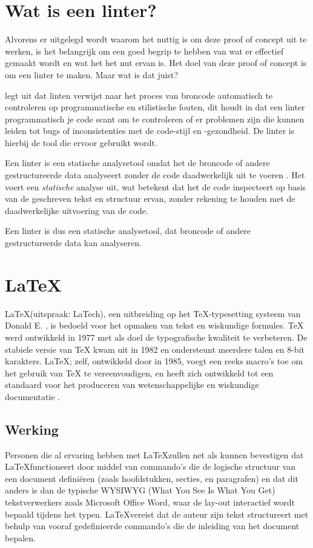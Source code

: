 \section{Wat is een linter?}
Alvorens er uitgelegd wordt waarom het nuttig is om deze proof of concept uit te werken, is het belangrijk om een goed begrip te hebben van wat er effectief gemaakt wordt en wat het het nut ervan is. Het doel van deze proof of concept is om een linter te maken. Maar wat is dat juist?

\textcite{Kamunya2023} legt uit dat linten verwijst naar het proces van broncode automatisch te controleren op programmatische en stilistische fouten, dit houdt in dat een linter programmatisch je code scant om te controleren of er problemen zijn die kunnen leiden tot bugs of inconsistenties met de code-stijl en -gezondheid. De linter is hierbij de tool die ervoor gebruikt wordt.

Een linter is een statische analysetool omdat het de broncode of andere gestructureerde data analyseert zonder de code daadwerkelijk uit te voeren \autocite{Moeller2023}. Het voert een \emph{statische} analyse uit, wat betekent dat het de code inspecteert op basis van de geschreven tekst en structuur ervan, zonder rekening te houden met de daadwerkelijke uitvoering van de code.

Een linter is dus een statische analysetool, dat broncode of andere gestructureerde data kan analyseren.

\section{\LaTeX}
\LaTeX (uitspraak: LaTech), een uitbreiding op het \TeX-typesetting systeem van Donald E. \textcite{Knuth1984}, is bedoeld voor het opmaken van tekst en wiskundige formules. TeX werd ontwikkeld in 1977 met als doel de typografische kwaliteit te verbeteren. De stabiele versie van TeX kwam uit in 1982 en ondersteunt meerdere talen en 8-bit karakters. \LaTeX; zelf, ontwikkeld door \textcite{Lamport1994} in 1985, voegt een reeks macro's toe om het gebruik van TeX te vereenvoudigen, en heeft zich ontwikkeld tot een standaard voor het produceren van wetenschappelijke en wiskundige documentatie \autocite{Oetiker2023}. 

\subsection{Werking}
Personen die al ervaring hebben met \LaTeX zullen net als \textcite{Oetiker2023} kunnen bevestigen dat \LaTeX functioneert door middel van commando's die de logische structuur van een document definiëren (zoals hoofdstukken, secties, en paragrafen) en dat dit anders is dan de typische WYSIWYG (What You See Is What You Get) tekstverwerkers zoals Microsoft Office Word, waar de lay-out interactief wordt bepaald tijdens het typen. \LaTeX vereist dat de auteur zijn tekst structureert met behulp van vooraf gedefinieerde commando's die de inleiding van het document bepalen. 


